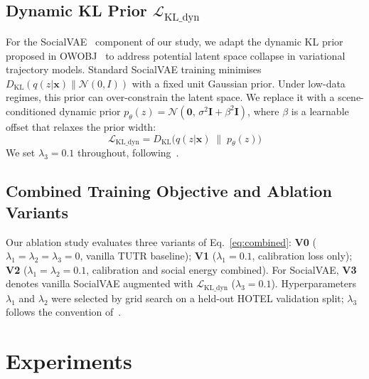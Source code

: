 \documentclass{article}
\begin{document}
\subsection{Dynamic KL Prior \(\mathcal{L}_{\text{KL\_dyn}}\)}
\label{sec:method:kl}

For the SocialVAE~\cite{xu2022socialvae} component of our study, we adapt the
dynamic KL prior proposed in OWOBJ~\cite{zhang2025openworld} to address
potential latent space collapse in variational trajectory models. Standard
SocialVAE training minimises
\(D_{\text{KL}}(q(z|\mathbf{x}) \| \mathcal{N}(0,I))\) with a fixed unit
Gaussian prior. Under low-data regimes, this prior can over-constrain the
latent space. We replace it with a scene-conditioned dynamic prior
\(p_\theta(z) = \mathcal{N}(\mathbf{0},\, \sigma^2 \mathbf{I} + \beta^2 \mathbf{I})\),
where \(\beta\) is a learnable offset that relaxes the prior width:
%
\begin{equation}
  \mathcal{L}_{\text{KL\_dyn}} = D_{\text{KL}}\!\bigl(
    q(z|\mathbf{x}) \;\|\; p_\theta(z)\bigr)
  \label{eq:lkl}
\end{equation}
%
We set \(\lambda_3 = 0.1\) throughout, following~\cite{zhang2025openworld}.

\subsection{Combined Training Objective and Ablation Variants}
\label{sec:method:combined}

Our ablation study evaluates three variants of Eq.~\eqref{eq:combined}:
\textbf{V0} (\(\lambda_1 = \lambda_2 = \lambda_3 = 0\), vanilla TUTR
baseline);
\textbf{V1} (\(\lambda_1 = 0.1\), calibration loss only);
\textbf{V2} (\(\lambda_1 = \lambda_2 = 0.1\), calibration and social energy
combined).
For SocialVAE, \textbf{V3} denotes vanilla SocialVAE augmented with
\(\mathcal{L}_{\text{KL\_dyn}}\) (\(\lambda_3 = 0.1\)).
Hyperparameters \(\lambda_1\) and \(\lambda_2\) were selected by grid search
on a held-out HOTEL validation split; \(\lambda_3\) follows the convention
of~\cite{zhang2025openworld}.



\section{Experiments}
\label{sec:experiments}
\end{document}
